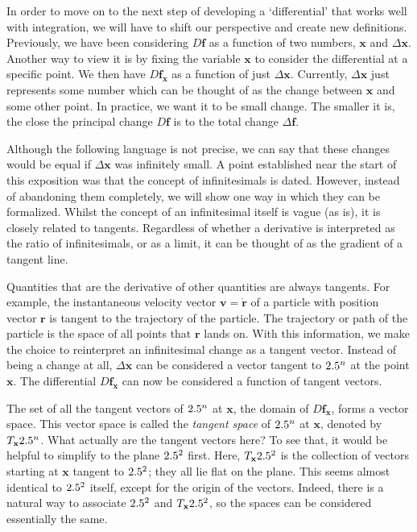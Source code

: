 \documentclass[a4paper,12pt]{article}
\begin{document}
In order to move on to the next step of developing a `differential' that works well with integration, we will have to shift our perspective and create new definitions.
Previously, we have been considering $D\mathbf{f}$ as a function of two numbers, $\mathbf{x}$ and $\Delta\mathbf{x}$.
Another way to view it is by fixing the variable $\mathbf{x}$ to consider the differential at a specific point.
We then have $D\mathbf{f_x}$ as a function of just $\Delta\mathbf{x}$.
Currently, $\Delta\mathbf{x}$ just represents some number which can be thought of as the change between $\mathbf{x}$ and some other point.
In practice, we want it to be small change.
The smaller it is, the close the principal change $D\mathbf{f}$ is to the total change $\Delta\mathbf{f}$.

Although the following language is not precise, we can say that these changes would be equal if $\Delta\mathbf{x}$ was infinitely small.
A point established near the start of this exposition was that the concept of infinitesimals is dated.
However, instead of abandoning them completely, we will show one way in which they can be formalized.
Whilst the concept of an infinitesimal itself is vague (as is), it is closely related to tangents.
Regardless of whether a derivative is interpreted as the ratio of infinitesimals, or as a limit, it can be thought of as the gradient of a tangent line.

Quantities that are the derivative of other quantities are always tangents.
For example, the instantaneous velocity vector $\mathbf{v} = \mathbf{\dot{r}}$ of a particle with position vector $\mathbf{r}$ is tangent to the trajectory of the particle.
The trajectory or path of the particle is the space of all points that $\mathbf{r}$ lands on.
With this information, we make the choice to reinterpret an infinitesimal change as a tangent vector.
Instead of being a change at all, $\Delta\mathbf{x}$ can be considered a vector tangent to $2.5^n$ at the point $\mathbf{x}$.
The differential $D\mathbf{f_x}$ can now be considered a function of tangent vectors.

The set of all the tangent vectors of $2.5^n$ at $\mathbf{x}$, the domain of $D\mathbf{f_x}$, forms a vector space.
This vector space is called the \emph{tangent space} of $2.5^n$ at $\mathbf{x}$, denoted by $T_\mathbf{x}2.5^n$.
What actually are the tangent vectors here?
To see that, it would be helpful to simplify to the plane $2.5^2$ first.
Here, $T_\mathbf{x} 2.5^2$ is the collection of vectors starting at $\mathbf{x}$ tangent to $2.5^2$; they all lie flat on the plane.
This seems almost identical to $2.5^2$ itself, except for the origin of the vectors.
Indeed, there is a natural way to associate $2.5^2$ and $T_\mathbf{x} 2.5^2$, so the spaces can be considered essentially the same.
\end{document}

